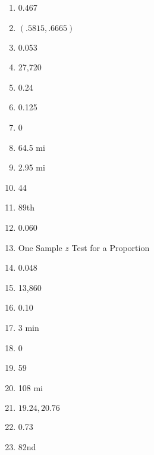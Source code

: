 \documentclass[../uilmath.tex]{subfiles}
\begin{document}
\begin{enumerate}[label=\bfseries\arabic*.]
    \item %
    0.467 

    \item %
    $(.5815, .6665)$

    \item %
    0.053

    \item %
    27,720

    \item %
    0.24

    \item %
    0.125

    \item %
    0

    \item %
    64.5 mi 

    \item %
    2.95 mi 

    \item %
    44

    \item %
    89th 

    \item %
    0.060

    \item %
    One Sample $z$ Test for a Proportion 

    \item %
    0.048

    \item %
    13,860

    \item %
    0.10

    \item %
    3 min

    \item %
    0

    \item %
    59

    \item %
    108 mi 

    \item %
    ${19.24, 20.76}$

    \item %
    0.73

    \item %
    82nd


\end{enumerate}
\end{document}
